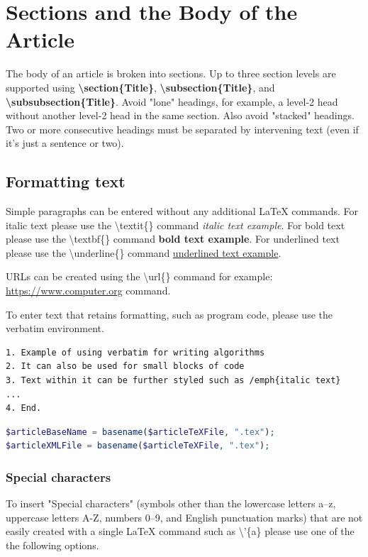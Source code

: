 \documentclass{csmagazine}
\begin{document}
\section{Sections and the Body of the Article}

The body of an article is broken into sections. Up to three section levels are supported using \textbf{\textbackslash{}section\{Title\}}, \textbf{\textbackslash{}subsection\{Title\}}, and \textbf{\textbackslash{}subsubsection\{Title\}}. Avoid "lone" headings, for example, a level-2 head without another level-2 head in the same section. Also avoid "stacked" headings. Two or more consecutive headings must be separated by intervening text (even if it's just a sentence or two).

\subsection{Formatting text}

Simple paragraphs can be entered without any additional LaTeX commands. For italic text please use the \textbackslash{}textit\{\} command \textit{italic text example}. For bold text please use the \textbackslash{}textbf\{\} command \textbf{bold text example}. For underlined text please use the \textbackslash{}underline\{\} command \underline{underlined text example}.

URLs can be created using the \textbackslash{}url\{\} command for example: \url{https://www.computer.org} command.

To enter text that retains formatting, such as program code, please use the verbatim environment.

\begin{verbatim}
1. Example of using verbatim for writing algorithms
2. It can also be used for small blocks of code
3. Text within it can be further styled such as /emph{italic text} 
...
4. End.
\end{verbatim}


\begin{lstlisting}[language=PhP]
$articleBaseName = basename($articleTeXFile, ".tex");
$articleXMLFile = basename($articleTeXFile, ".tex");
\end{lstlisting}

\subsubsection{Special characters}

To insert "Special characters" (symbols other than the lowercase letters a–z, uppercase letters A-Z, numbers 0–9, and English punctuation marks) that are not easily created with a single LaTeX command such as \textbackslash{}'\{a\} please use one of the the following options.
\end{document}
